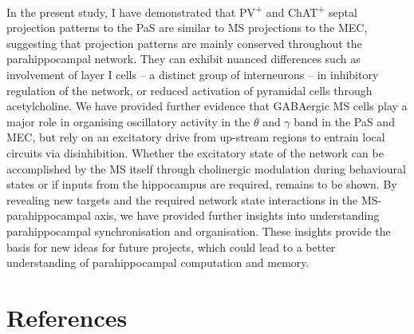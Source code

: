 \documentclass[
  12pt,
  a4paper,
  openany]{book}
\begin{document}
In the present study, I have demonstrated that PV\textsuperscript{+} and ChAT\textsuperscript{+} septal projection patterns to the PaS are similar to MS projections to the MEC, suggesting that projection patterns are mainly conserved throughout the parahippocampal network. They can exhibit nuanced differences such as involvement of layer I cells -- a distinct group of interneurons -- in inhibitory regulation of the network, or reduced activation of pyramidal cells through acetylcholine. We have provided further evidence that GABAergic MS cells play a major role in organising oscillatory activity in the \(\theta\) and \(\gamma\) band in the PaS and MEC, but rely on an excitatory drive from up-stream regions to entrain local circuits via disinhibition. Whether the excitatory state of the network can be accomplished by the MS itself through cholinergic modulation during behavioural states or if inputs from the hippocampus are required, remains to be shown. By revealing new targets and the required network state interactions in the MS-parahippocampal axis, we have provided further insights into understanding parahippocampal synchronisation and organisation. These insights provide the basis for new ideas for future projects, which could lead to a better understanding of parahippocampal computation and memory.

\hypertarget{references}{%
\chapter*{References}\label{references}}

\small\begingroup

\noindent
\vspace{-2em}
\setlength{\parindent}{-0.2in}
\setlength{\leftskip}{0.3in}
\setlength{\parskip}{2.5pt}
\end{document}
